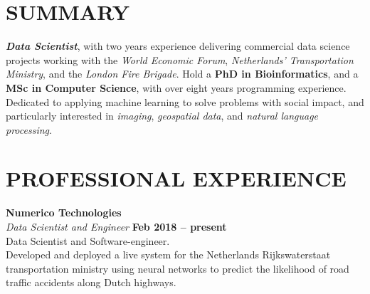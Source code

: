 \documentclass[margin,line]{resume}
\begin{document}
\begin{resume}

    \vspace{-3mm}

    \section{\mysidestyle \textbf{\large{S}\small{UMMARY}}}

    \textbf{\textsl{Data Scientist}}, with two years experience delivering commercial data science projects working with the \textsl{World Economic Forum}, \textsl{Netherlands' Transportation Ministry}, and the \textsl{London Fire Brigade}.  Hold a \textbf{PhD in Bioinformatics}, and a \textbf{MSc in Computer Science}, with over eight years programming experience.  Dedicated to applying machine learning to solve problems with social impact, and particularly interested in \textsl{imaging}, \textsl{geospatial data}, and \textsl{natural language processing}.

    \vspace{-1mm}

\sectionline

    \section{\mysidestyle \textbf{\large{P}\small{ROFESSIONAL} \large{E}\small{XPERIENCE}}}

    \textbf{\listing Numerico Technologies} \vspace{2mm}\\\vspace{1mm}%
    \textsl{Data Scientist and Engineer} \hfill \textbf{Feb 2018 -- present}\\
    Data Scientist and Software-engineer. \\
	 Developed and deployed a live system for the Netherlands Rijkswaterstaat transportation ministry using neural networks to predict the likelihood of road traffic accidents along Dutch highways.


\end{resume}
\end{document}
